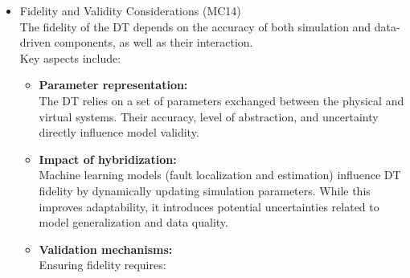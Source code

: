 \documentclass[
]{article}
\providecommand{\tightlist}{%
  \setlength{\itemsep}{0pt}\setlength{\parskip}{0pt}}
\begin{document}
\begin{itemize}
\begin{itemize}
\begin{itemize}
\begin{itemize}
        \begin{itemize}
        \tightlist
        \item
          \textbf{Model evolution:}\\
          The simulation model progresses from a purely hydraulic
          representation to a \textbf{thermo-hydraulic model},
          increasing fidelity.
        \item
          \textbf{Learning strategy evolution:}\\
          The initial approach relies on generating dedicated datasets
          and training models per use case. This process is expected to
          evolve toward more advanced strategies, such as
          \textbf{continual learning}, enabling adaptation without full
          retraining.
        \item
          \textbf{Operational adaptation:}\\
          The DT incorporates mechanisms such as divergence detection,
          which trigger recalibration or parameter updates during
          operation.
        \end{itemize}
      \item
        Fidelity and Validity Considerations (MC14)\\
        The fidelity of the DT depends on the accuracy of both
        simulation and data-driven components, as well as their
        interaction.\\
        Key aspects include:

        \begin{itemize}
        \tightlist
        \item
          \textbf{Parameter representation:}\\
          The DT relies on a set of parameters exchanged between the
          physical and virtual systems. Their accuracy, level of
          abstraction, and uncertainty directly influence model
          validity.
        \item
          \textbf{Impact of hybridization:}\\
          Machine learning models (fault localization and estimation)
          influence DT fidelity by dynamically updating simulation
          parameters. While this improves adaptability, it introduces
          potential uncertainties related to model generalization and
          data quality.
        \item
          \textbf{Validation mechanisms:}\\
          Ensuring fidelity requires:


\end{itemize}
\end{itemize}
\end{itemize}
\end{itemize}
\end{itemize}
\end{document}
